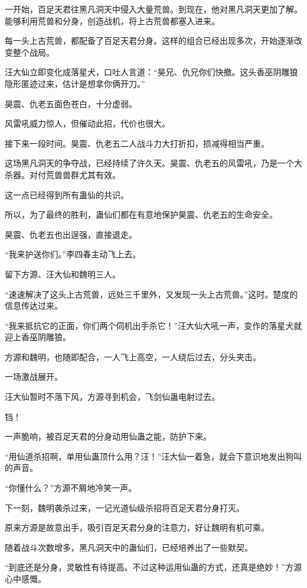 \begin{this_body}
一开始，百足天君往黑凡洞天中侵入大量荒兽。到现在，他对黑凡洞天更加了解。能够利用荒兽和分身，创造战机，将上古荒兽都塞入进来。

每一头上古荒兽，都配备了百足天君分身。这样的组合已经出现多次，开始逐渐改变整个战局。

汪大仙立即变化成落星犬，口吐人言道：“昊兄、仇兄你们快撤。这头香巫阴雕狼隐形匿迹过来，估计是想拿你俩开刀。”

昊震、仇老五面色苍白，十分虚弱。

风雷吼威力惊人，但催动此招，代价也很大。

接下来一段时间。昊震、仇老五二人战斗力大打折扣，损减得相当严重。

这场黑凡洞天的争夺战，已经持续了许久天。昊震、仇老五的风雷吼，乃是一个大杀器。对付荒兽兽群尤其有效。

这一点已经得到所有蛊仙的共识。

所以，为了最终的胜利，蛊仙们都在有意地保护昊震、仇老五的生命安全。

昊震、仇老五也出逞强，直接退走。

“我来护送你们。”李四春主动飞上去。

留下方源、汪大仙和魏明三人。

“速速解决了这头上古荒兽，远处三千里外，又发现一头上古荒兽。”这时。楚度的信息传达过来。

“我来抵抗它的正面，你们两个伺机出手杀它！”汪大仙大吼一声，变作的落星犬就迎上香巫阴雕狼。

方源和魏明，也随即配合，一人飞上高空，一人绕后过去，分头夹击。

一场激战展开。

汪大仙暂时不落下风，方源寻到机会，飞剑仙蛊电射过去。

铛！

一声脆响，被百足天君的分身动用仙蛊之能，防护下来。

“用仙道杀招啊，单用仙蛊顶什么用？汪！”汪大仙一着急，就会下意识地发出狗叫的声音。

“你懂什么？”方源不屑地冷笑一声。

下一刻，魏明袭杀过来，一记光道仙级杀招将百足天君分身打灭。

原来方源是故意出手，吸引百足天君分身的注意力，好让魏明有机可乘。

随着战斗次数增多，黑凡洞天中的蛊仙们，已经培养出了一些默契。

“到底还是分身，灵敏性有待提高。不过这种运用仙蛊的方式，还真是绝妙！”方源心中感慨。


\end{this_body}
